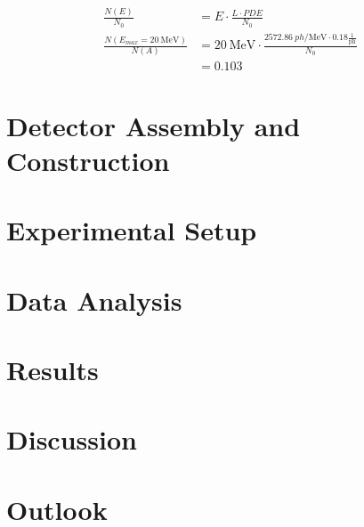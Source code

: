 \begin{align}
    \frac{N(E)}{N_0} &= E  \cdot \frac{L \cdot PDE}{N_0}\\
    \frac{N(E_{max}=\SI{20}{\mega\electronvolt})}{N(A)} 
    &=  \SI{20}{\mega\electronvolt} \cdot \frac{\SI{2572.86}{ph\per\mega\electronvolt} \cdot 0.18 \frac{\text{1}}{\text{ph}}}{N_0} \\
    &= 0.103
\end{align}

\section{Detector Assembly and Construction}
\section{Experimental Setup}
\section{Data Analysis}
\section{Results}
\section{Discussion}
\section{Outlook}
